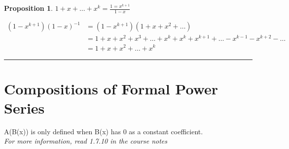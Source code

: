 \documentclass{article}
\newtheorem{prop}[theorem]{Proposition}
\newenvironment{proof}{{\bf Proof:}}{\hfill\rule{2mm}{2mm}}
\newenvironment{ablock}[1]{%
    \tcolorbox[beamer,%
    noparskip,breakable,
    colback=lightcoral,colframe=darkred,%
    colbacklower=tomato!75!lightcoral,%
    title=#1]}%
    {\endtcolorbox}
\begin{document}
\begin{prop}
\(1 + x + \ldots + x^k = \frac{1 = x^{k + 1}}{1 - x}\)
\end{prop}

\begin{proof}
\[\begin{aligned}
(1 - x^{k + 1}) ( 1 - x)^{-1} & = ( 1 - x ^{k + 1}) (1 + x + x^2 + \ldots) \\
& = 1 + x + x^2 + x^3 + \ldots + x^k + x^ k + x^{k + 1} + \ldots - x^{k - 1} - x^{k + 2} - \ldots \\
& = 1 + x + x^2 + \ldots + x^k 
\end{aligned}\]
\end{proof}

\section*{Compositions of Formal Power Series}
\begin{ablock}{Fact}
A(B(x)) is only defined when B(x) has 0 as a constant coefficient. \\
\textit{For more information, read 1.7.10 in the course notes}
\end{ablock}
\end{document}
